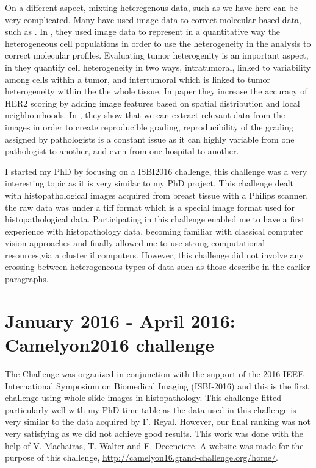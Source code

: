 \documentclass[a4paper,10pt]{article}
\begin{document}
On a different aspect, mixting heteregenous data, such as we have here can be very complicated. Many have used image data to correct molecular based data, such as \citet{yuan2012quantitative}. In \cite{yuan2012quantitative}, they used image data to represent in a quantitative way the heterogeneous cell populations in order to use the heterogeneity in the analysis to correct molecular profiles. Evaluating tumor heterogenity is an important aspect, in \cite{potts2012evaluating} they quantify cell heterogeneity in two ways, intratumoral, linked to variability among cells within a tumor, and intertumoral which is linked to tumor heterogeneity within the the whole tissue. In \cite{potts2012evaluating} paper they increase the accuracy of HER2 scoring by adding image features based on spatial distribution and local neighbourhoods. In \cite{petushi2006large}, they show that we can extract relevant data from the images in order to create reproducible grading, reproducibility of the grading assigned by pathologists is a constant issue as it can highly variable from one pathologist to another, and even from one hospital to another. 										


I started my PhD by focusing on a ISBI2016 challenge, this challenge was a very interesting topic as it is very similar to my PhD project. This challenge dealt with histopathological images acquired from breast tissue with a Philips scanner, the raw data was under a tiff format which is a special image format used for histopathological data. Participating in this challenge enabled me to have a first experience with histopathology data, becoming familiar with classical computer vision approaches and finally allowed me to use strong computational resources,via a cluster if computers. However, this challenge did not involve any crossing between heterogeneous types of data such as those describe in the earlier paragraphs.

\section{January 2016 - April 2016: Camelyon2016 challenge}

The Challenge was organized in conjunction with the support of the 2016 IEEE International Symposium on Biomedical Imaging  (ISBI-2016) and this is the first challenge using whole-slide images in histopathology. This challenge fitted particularly well with my PhD time table as the data used in this challenge is very similar to the data acquired by F. Reyal. However, our final ranking was not very satisfying as we did not achieve good results. This work was done with the help of V. Machairas, T. Walter and E. Decenciere. A website was made for the purpose of this challenge, \url{http://camelyon16.grand-challenge.org/home/}.
\end{document}
